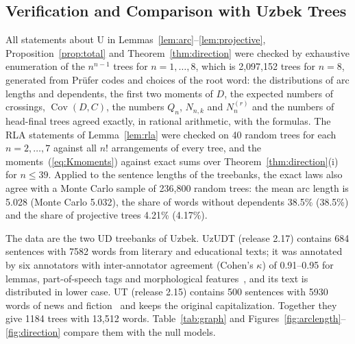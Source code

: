 \documentclass[mathematics,article,submit,pdftex,oneauthor]{Definitions/mdpi}
\newcommand{\Cov}{\operatorname{Cov}}
\begin{document}
\subsection{Verification and Comparison with Uzbek Trees}\label{sec:randomcheck}
All statements about U in Lemmas~\ref{lem:arc}--\ref{lem:projective}, Proposition~\ref{prop:total} and Theorem~\ref{thm:direction} were checked by exhaustive enumeration of the $n^{n-1}$ trees for $n=1,\dots,8$, which is 2,097,152 trees for $n=8$, generated from Pr\"ufer codes and choices of the root word: the distributions of arc lengths and dependents, the first two moments of $D$, the expected numbers of crossings, $\Cov(D,C)$, the numbers $Q_n$, $N_{n,k}$ and $N^{(r)}_n$ and the numbers of head-final trees agreed exactly, in rational arithmetic, with the formulas.
The RLA statements of Lemma~\ref{lem:rla} were checked on 40 random trees for each $n=2,\dots,7$ against all $n!$ arrangements of every tree, and the moments~(\ref{eq:Kmoments}) against exact sums over Theorem~\ref{thm:direction}(i) for $n\leqslant39$.
Applied to the sentence lengths of the treebanks, the exact laws also agree with a Monte Carlo sample of 236,800 random trees: the mean arc length is 5.028 (Monte Carlo 5.032), the share of words without dependents 38.5\% (38.5\%) and the share of projective trees 4.21\% (4.17\%).

The data are the two UD treebanks of Uzbek.
UzUDT (release 2.17) contains 684 sentences with 7582 words from literary and educational texts; it was annotated by six annotators with inter-annotator agreement (Cohen's $\kappa$) of 0.91--0.95 for lemmas, part-of-speech tags and morphological features~\cite{MatlatipovDiB2026,MatlatipovLREC2026}, and its text is distributed in lower case.
UT (release 2.15) contains 500 sentences with 5930 words of news and fiction~\cite{Akhundjanova2025} and keeps the original capitalization.
Together they give 1184 trees with 13,512 words.
Table~\ref{tab:graph} and Figures~\ref{fig:arclength}--\ref{fig:direction} compare them with the null models.


\end{document}
